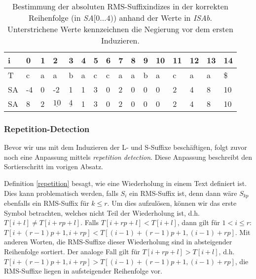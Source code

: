 \begin{table}
	\begin{tabular}{l|lllllllllllllll}
		i  & 0                         & 1                         & 2                                        & 3                                       & 4 & 5 & 6 & 7 & 8 & 9 & 10 & 11 & 12 & 13 & 14 \\ \hline
		T  & c                         & a                         & a                                        & b                                       & a & c & c & a & a & b & a  & c  & a  & a  & \$ \\ \hline
		SA & -4                        & 0                         & -2                                       & 1                                       & 1 & 3 & 0 & 2 & 0 & 0 & 0  & 2  & 4  & 8  & 10 \\ \hline
		SA & \cellcolor[HTML]{32CB00}8 & \cellcolor[HTML]{32CB00}2 & \cellcolor[HTML]{32CB00}$\underline{10}$ & \cellcolor[HTML]{32CB00}$\underline{4}$ & 1 & 3 & 0 & 2 & 0 & 0 & 0  & 2  & 4  & 8  & 10 \\ \hline
	\end{tabular}
	\caption{Bestimmung der absoluten RMS-Suffixindizes in der korrekten Reihenfolge (in \textit{SA}$[0\dots 4)$) anhand der Werte in \textit{ISAb}. Unterstrichene Werte kennzeichnen die Negierung vor dem ersten Induzieren.}
	\label{dss:table:correct-indices}
\end{table}

\subsubsection{Repetition-Detection}
Bevor wir uns mit dem Induzieren der L- und S-Suffixe beschäftigen, folgt zuvor noch eine Anpassung mittels \textit{repetition detection}. Diese Anpassung beschreibt den Sortierschritt im vorigen Absatz.

Definition \ref{repetition} besagt, wie eine Wiederholung in einem Text definiert ist. Dies kann problematisch werden, falls $S_i$ ein RMS-Suffix ist, denn dann wäre $S_{kp}$ ebenfalls ein RMS-Suffix für $k \leq r$. Um dies aufzulösen, können wir das erste Symbol betrachten, welches nicht Teil der Wiederholung ist, d.h. $T[i + l] \neq T[i + rp + l]$. Falls $T[i + rp + l] < T[i + l]$, dann gilt für $1 < i \leq r$:$T[i + (r-1)p + 1, i+rp] < T[(i-1) + (r-1)p + 1, (i-1) + rp]$. Mit anderen Worten, die RMS-Suffixe dieser Wiederholung sind in absteigender Reihenfolge sortiert. Der analoge Fall gilt für $T[i + rp + l] > T[i + l]$, d.h. $T[i + (r-1)p + 1, i + rp] > T[(i-1) + (r-1)p + 1, (i-1) + rp]$, die RMS-Suffixe liegen in aufsteigender Reihenfolge vor.

